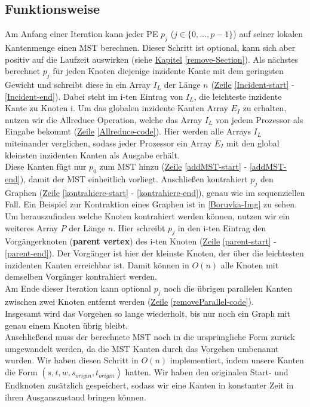 \subsection{Funktionsweise}\label{Funktion-Borruvka}
Am Anfang einer Iteration kann jeder PE $p_j$ ($j \in \{0, ..., p-1\}$) auf seiner lokalen Kantenmenge einen MST berechnen. Dieser Schritt ist optional, kann sich aber positiv auf die Laufzeit auswirken (siehe \hyperref[remove-Section]{Kapitel} \ref{remove-Section}).
Als nächstes berechnet $p_j$ für jeden Knoten diejenige inzidente Kante mit dem geringsten Gewicht und schreibt diese in ein Array $I_L$ der Länge $n$ (\hyperref[Incident-start]{Zeile} \ref{Incident-start} - \ref{Incident-end}). Dabei steht im i-ten Eintrag von $I_L$, die leichteste inzidente Kante zu Knoten i. Um das globalen inzidente Kanten Array $E_I$ zu erhalten, nutzen wir die Allreduce Operation, welche das Array $I_L$ von jedem Prozessor als Eingabe bekommt (\hyperref[Allreduce-code]{Zeile} \ref{Allreduce-code}). Hier werden alle Arrays $I_L$ miteinander verglichen, sodass jeder Prozessor ein Array $E_I$ mit den global kleinsten inzidenten Kanten als Ausgabe erhält. \\
Diese Kanten fügt nur $p_0$ zum MST hinzu (\hyperref[addMST-start]{Zeile} \ref{addMST-start} - \ref{addMST-end}), damit der MST einheitlich vorliegt.
Anschließen kontrahiert $p_j$ den Graphen (\hyperref[kontrahiere-start]{Zeile} \ref{kontrahiere-start} - \ref{kontrahiere-end}), genau wie im sequenziellen Fall. Ein Beispiel zur Kontraktion eines Graphen ist in \cref{Boruvka-Img} zu sehen.
Um herauszufinden welche Knoten kontrahiert werden können, nutzen wir ein weiteres Array $P$ der Länge $n$. Hier schreibt $p_j$ in den i-ten Eintrag den Vorgängerknoten (\textbf{parent vertex}) des i-ten Knoten (\hyperref[parent-start]{Zeile} \ref{parent-start} - \ref{parent-end}).
Der Vorgänger ist hier der kleinste Knoten, der über die leichtesten inzidenten Kanten erreichbar ist. Damit können in $O(n)$ alle Knoten mit demselben Vorgänger kontrahiert werden.\\
Am Ende dieser Iteration kann optional $p_j$ noch die übrigen parallelen Kanten zwischen zwei Knoten entfernt werden (\hyperref[removeParallel-code]{Zeile} \ref{removeParallel-code}). \\
Insgesamt wird das Vorgehen so lange wiederholt, bis nur noch ein Graph mit genau einem Knoten übrig bleibt.\\
Anschließend muss der berechnete MST noch in die ursprüngliche Form zurück umgewandelt werden, da die MST Kanten durch das Vorgehen umbenannt wurden.
Wir haben diesen Schritt in $O(n)$ implementiert, indem unsere Kanten die Form $(s,t,w,s_{origin},t_{origin})$ hatten. Wir haben den originalen Start- und Endknoten zusätzlich gespeichert, sodass wir eine Kanten in konstanter Zeit in ihren Ausganszustand bringen können.


